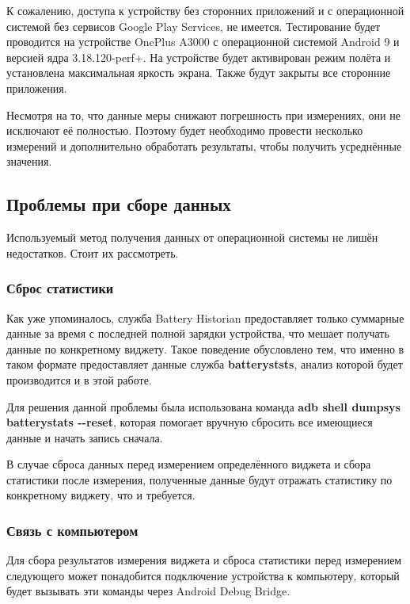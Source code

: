 \documentclass[a4paper,14pt]{extarticle} %
\begin{document}
	К сожалению, доступа к устройству без сторонних приложений и с операционной системой без сервисов Google Play Services, не имеется. Тестирование будет проводится на устройстве OnePlus A3000 с операционной системой Android 9 и версией ядра 3.18.120-perf+. На устройстве будет активирован режим полёта и установлена максимальная яркость экрана. Также будут закрыты все сторонние приложения.

	Несмотря на то, что данные меры снижают погрешность при измерениях, они не исключают её полностью. Поэтому будет необходимо провести несколько измерений и дополнительно обработать результаты, чтобы получить усреднённые значения.
	
	\subsection{Проблемы при сборе данных}
	
	Используемый метод получения данных от операционной системы не лишён недостатков. Стоит их рассмотреть.
	
	\subsubsection{Сброс статистики}
	
	Как уже упоминалось, служба Battery Historian предоставляет только суммарные данные за время с последней полной зарядки устройства, что мешает получать данные по конкретному виджету. Такое поведение обусловлено тем, что именно в таком формате предоставляет данные служба \textbf{batteryststs}, анализ которой будет производится и в этой работе.
	
	Для решения данной проблемы была использована команда \textbf{adb shell dumpsys batterystats -{}-reset}, которая помогает вручную сбросить все имеющиеся данные и начать запись сначала. 
	
	В случае сброса данных перед измерением определённого виджета и сбора статистики после измерения, полученные данные будут отражать статистику по конкретному виджету, что и требуется.
	
	\subsubsection{Связь с компьютером} \label{subsub:connection}
	
	Для сбора результатов измерения виджета и сброса статистики перед измерением следующего может понадобится подключение устройства к компьютеру, который будет вызывать эти команды через Android Debug Bridge.
	
\end{document}
